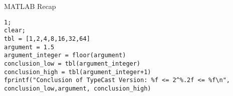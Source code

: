 \begin{task}{MATLAB Recap}{}{}
\begin{enumerate}
  \end{enumerate}


  
  
  \begin{solution}
    \begin{lstlisting}
1;
clear;
tbl = [1,2,4,8,16,32,64]
argument = 1.5
argument_integer = floor(argument)
conclusion_low = tbl(argument_integer)
conclusion_high = tbl(argument_integer+1)
fprintf("Conclusion of TypeCast Version: %f <= 2^%.2f <= %f\n", conclusion_low,argument, conclusion_high)
      \end{lstlisting}

    \end{solution}
\end{task}
